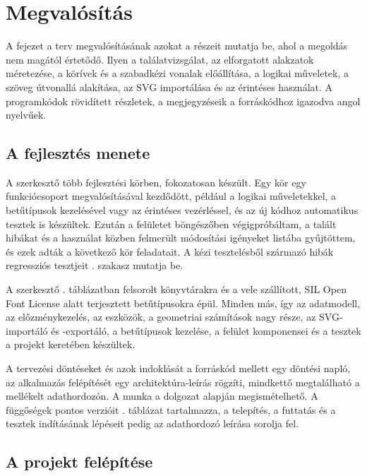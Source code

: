 \chapter{Megvalósítás}
\label{ch:implementation}

A fejezet a terv megvalósításának azokat a részeit mutatja be, ahol a megoldás nem magától értetődő. Ilyen a találatvizsgálat, az elforgatott alakzatok méretezése, a körívek és a szabadkézi vonalak előállítása, a logikai műveletek, a szöveg útvonallá alakítása, az SVG importálása és az érintéses használat. A programkódok rövidített részletek, a megjegyzéseik a forráskódhoz igazodva angol nyelvűek.

\section{A fejlesztés menete}
\label{sec:dev_process}

A szerkesztő több fejlesztési körben, fokozatosan készült. Egy kör egy funkciócsoport megvalósításával kezdődött, például a logikai műveletekkel, a betűtípusok kezelésével vagy az érintéses vezérléssel, és az új kódhoz automatikus tesztek is készültek. Ezután a felületet böngészőben végigpróbáltam, a talált hibákat és a használat közben felmerült módosítási igényeket listába gyűjtöttem, és ezek adták a következő kör feladatait. A kézi tesztelésből származó hibák regressziós tesztjeit . szakasz mutatja be.

A szerkesztő . táblázatban felsorolt könyvtárakra és a vele szállított, SIL Open Font License alatt terjesztett betűtípusokra épül. Minden más, így az adatmodell, az előzménykezelés, az eszközök, a geometriai számítások nagy része, az SVG-importáló és -exportáló, a betűtípusok kezelése, a felület komponensei és a tesztek a projekt keretében készültek.

A tervezési döntéseket és azok indoklását a forráskód mellett egy döntési napló, az alkalmazás felépítését egy architektúra-leírás rögzíti, mindkettő megtalálható a mellékelt adathordozón. A munka a dolgozat alapján megismételhető. A függőségek pontos verzióit . táblázat tartalmazza, a telepítés, a futtatás és a tesztek indításának lépéseit pedig az adathordozó leírása sorolja fel.

\section{A projekt felépítése}
\label{sec:project_structure}

